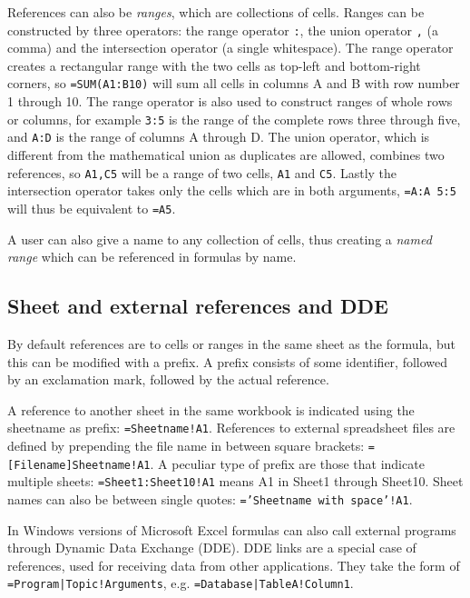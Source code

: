 \documentclass[conference]{IEEEtran}
\begin{document}
References can also be \emph{ranges}, which are collections of cells.
Ranges can be constructed by three operators: the range operator \texttt{:}, the union operator \texttt{,} (a comma) and the intersection operator \texttt{} (a single whitespace).
The range operator creates a rectangular range with the two cells as top-left and bottom-right corners, so \texttt{=SUM(A1:B10)} will sum all cells in columns A and B with row number 1 through 10.
The range operator is also used to construct ranges of whole rows or columns, for example \texttt{3:5} is the range of the complete rows three through five, and \texttt{A:D} is the range of columns A through D.
The union operator, which is different from the mathematical union as duplicates are allowed, combines two references, so \texttt{A1,C5} will be a range of two cells, \texttt{A1} and \texttt{C5}.
Lastly the intersection operator takes only the cells which are in both arguments, \texttt{=A:A 5:5} will thus be equivalent to \texttt{=A5}.

A user can also give a name to any collection of cells, thus creating a \emph{named range} which can be referenced in formulas by name.

\subsection{Sheet and external references and DDE}
\label{subsection:ExternalRefsDDE}

By default references are to cells or ranges in the same sheet as the formula, but this can be modified with a prefix. A prefix consists of some identifier, followed by an exclamation mark, followed by the actual reference.

A reference to another sheet in the same workbook is indicated using the sheetname as prefix: \texttt{=Sheetname!A1}. References to external spreadsheet files are defined by prepending the file name in between square brackets: \texttt{=[Filename]Sheetname!A1}.
A peculiar type of prefix are those that indicate multiple sheets: \texttt{=Sheet1:Sheet10!A1} means A1 in Sheet1 through Sheet10.
Sheet names can also be between single quotes: \texttt{='Sheetname with space'!A1}. 

In Windows versions of Microsoft Excel formulas can also call external programs through Dynamic Data Exchange (DDE). DDE links are a special case of references, used for receiving data from other applications. They take the form of \texttt{=Program|Topic!Arguments}, e.g. \texttt{=Database|TableA!Column1}.
\end{document}
